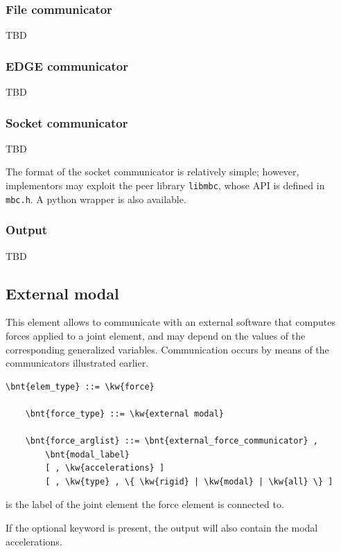 \subsubsection{File communicator}
TBD

\subsubsection{EDGE communicator}
TBD

\subsubsection{Socket communicator}
TBD

The format of the socket communicator is relatively simple;
however, implementors may exploit the peer library \texttt{libmbc},
whose API is defined in \texttt{mbc.h}.
A python wrapper is also available.

\subsubsection{Output}
TBD



\subsection{External modal}
\label{sec:EL:FORCE:EXTERNAL:MODAL}
This element allows to communicate with an external software that computes
forces applied to a 
 joint element,
and may depend on the values of the corresponding generalized variables.
Communication occurs by means of the communicators illustrated earlier.
\begin{Verbatim}[commandchars=\\\{\}]
    \bnt{elem_type} ::= \kw{force}

    \bnt{force_type} ::= \kw{external modal}

    \bnt{force_arglist} ::= \bnt{external_force_communicator} ,
        \bnt{modal_label}
        [ , \kw{accelerations} ]
        [ , \kw{type} , \{ \kw{rigid} | \kw{modal} | \kw{all} \} ]
\end{Verbatim}
 is the label of the 
 joint element
the force element is connected to.

If the optional keyword  is present,
the output will also contain the modal accelerations.

